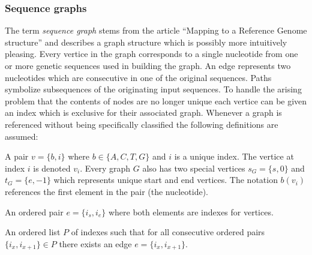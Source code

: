 \documentclass[thesis.tex]{subfiles}
\begin{document}
\subsubsection{Sequence graphs}
The term \textit{sequence graph} stems from the article ``Mapping to a Reference Genome structure''\cite{mapping_to_a_reference_genome_structure} and describes a graph structure which is possibly more intuitively pleasing. Every vertice in the graph corresponds to a single nucleotide from one or more genetic sequences used in building the graph. An edge represents two nucleotides which are consecutive in one of the original sequences. Paths symbolize subsequences of the originating input sequences. To handle the arising problem that the contents of nodes are no longer unique each vertice can be given an index which is exclusive for their associated graph. Whenever a graph is referenced without being specifically classified the following definitions are assumed:\\
\begin{defn}[Vertice]
  A pair $v=\{b, i\}$ where $b \in \{A, C, T, G\}$ and $i$ is a unique index. The vertice at index $i$ is denoted $v_i$. Every graph $G$ also has two special vertices $s_G=\{s, 0\}$ and $t_G=\{e, -1\}$ which represents unique start and end vertices. The notation $b(v_i)$ references the first element in the pair (the nucleotide).
\end{defn}
\begin{defn}[Edge]
  An ordered pair $e=\{i_s, i_e\}$ where both elements are indexes for vertices. 
\end{defn}
\begin{defn}[Path]
  An ordered list $P$ of indexes such that for all consecutive ordered pairs $\{i_x, i_{x+1}\} \in P$ there exists an edge $e=\{i_x, i_{x+1}\}$.
\end{defn}
\end{document}
